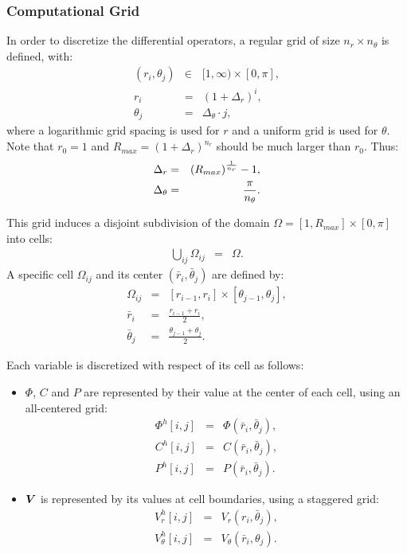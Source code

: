 \subsubsection{Computational Grid}
In order to discretize the differential operators, 
a regular grid of size $n_r \times n_\theta$ is defined, with:
\begin{eqnarray}
(r_i,\theta_j) &\in& [1, \infty) \times [0,\pi], \\ 
r_i &=& (1+\Delta_r)^i, \\
\theta_j &=& \Delta_\theta \cdot j,
\end{eqnarray}
where a logarithmic grid spacing is used for $r$ and a uniform grid is used for $\theta$.
Note that $r_0 = 1$ and $R_{max} = (1+\Delta_r)^{n_r}$ should be much 
larger than $r_0$. Thus:
\begin{eqnarray}
\Delta_r &=& \left(R_{max}\right) ^ \frac{1}{n_r} - 1, \\
\Delta_\theta &=& \frac{\pi}{n_\theta}.
\end{eqnarray}

This grid induces a disjoint subdivision of the domain 
$\Omega = [1, R_{max}] \times [0,\pi]$ into cells:
\begin{eqnarray}
\bigcup_{ij}\Omega_{ij} &=& \Omega.
\end{eqnarray}
A specific cell $\Omega_{ij}$ and its center $(\bar{r}_i, \bar{\theta}_j)$ are defined by:
\begin{eqnarray}
\Omega_{ij} &=& [r_{i-1}, r_{i}] \times [\theta_{j-1}, \theta_{j}], \\
\bar{r}_i &=& \frac{r_{i-1} + r_{i}}{2}, \\
\bar{\theta}_j &=& \frac{\theta_{j-1} + \theta_{j}}{2}.
\end{eqnarray}

Each variable is discretized with respect of its cell as follows:
\begin{itemize}
\item $\varPhi$, $C$ and $P$ are represented by their value at the center of each cell, 
using an all-centered grid:
\begin{eqnarray}
\varPhi^h[i,j] &=& \varPhi(\bar{r}_i, \bar{\theta}_j), \\
C^h[i,j] &=& C(\bar{r}_i, \bar{\theta}_j), \\
P^h[i,j] &=& P(\bar{r}_i, \bar{\theta}_j).
\end{eqnarray}
\item $\boldsymbol{V}$ is represented by its values at cell boundaries, using a staggered grid:
\begin{eqnarray}
V_r^h[i,j] &=& V_r(r_i, \bar{\theta}_j), \\
V_\theta^h[i,j] &=& V_\theta(\bar{r}_i, {\theta}_j).
\end{eqnarray}
\end{itemize}

